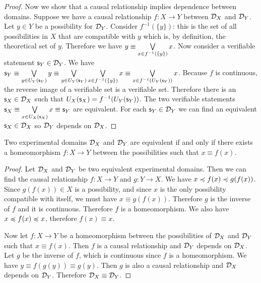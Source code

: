 \begin{mathSection}
\begin{proof}
		Now we show that a causal relationship implies dependence between domains. Suppose we have a causal relationship $f: X \to Y$ between $\mathcal{D}_X$ and $\mathcal{D}_Y$. Let $y \in Y$ be a possibility for $\mathcal{D}_Y$. Consider  $f^{-1}(\{y\})$: this is the set of all possibilities in $X$ that are compatible with $y$ which is, by definition, the theoretical set of $y$. Therefore we have $y \equiv \bigvee\limits_{x \in f^{-1}(\{y\})} x$. Now consider a verifiable statement $\mathsf{s}_Y \in \mathcal{D}_Y$. We have $\mathsf{s}_Y \equiv \bigvee\limits_{y \in U_Y(\mathsf{s}_Y)} y \equiv \bigvee\limits_{y \in U_Y(\mathsf{s}_Y)} \bigvee\limits_{x \in f^{-1}(\{y\})} x \equiv \bigvee\limits_{x \in f^{-1}(U_Y(\mathsf{s}_Y))} x$. Because $f$ is continuous, the reverse image of a verifiable set is a verifiable set. Therefore there is an $\mathsf{s}_X \in \mathcal{D}_X$ such that $U_X(\mathsf{s}_X) = f^{-1}(U_Y(\mathsf{s}_Y))$. The two verifiable statements $\mathsf{s}_X \equiv \bigvee\limits_{x \in U_X(\mathsf{s}_X)} x \equiv \mathsf{s}_Y$ are equivalent. For each $\mathsf{s}_Y \in \mathcal{D}_Y$ we can find an equivalent $\mathsf{s}_X \in \mathcal{D}_X$ so $\mathcal{D}_Y$ depends on $\mathcal{D}_X$.
	\end{proof}
	
	\begin{coro}
		Two experimental domains $\mathcal{D}_{X}$ and $\mathcal{D}_{Y}$ are equivalent if and only if there exists a homeomorphism $f : X \to Y$ between the possibilities such that $x \equiv f(x)$.
	\end{coro}
	\begin{proof}
		Let $\mathcal{D}_{X}$ and $\mathcal{D}_{Y}$ be two equivalent experimental domains. Then we can find the causal relationship $f : X \to Y$ and $g : Y \to X$. We have $x \preccurlyeq f(x) \preccurlyeq g(f(x))$. Since $g(f(x)) \in X$ is a possibility, and since $x$ is the only possibility compatible with itself, we must have $x \equiv g(f(x))$. Therefore $g$ is the inverse of $f$ and it is continuous. Therefore $f$ is a homeomorphism. We also have $x \preccurlyeq f(x) \preccurlyeq x$, therefore $f(x) \equiv x$.
		
		Now let $f : X \to Y$ be a homeomorphism between the possibilities of $\mathcal{D}_{X}$ and $\mathcal{D}_{Y}$ such that $x \equiv f(x)$. Then $f$ is a causal relationship and $\mathcal{D}_{Y}$ depends on $\mathcal{D}_{X}$. Let $g$ be the inverse of $f$, which is continuous since $f$ is a homeomorphism. We have $y \equiv f(g(y)) \equiv g(y)$. Then $g$ is also a causal relationship and $\mathcal{D}_{X}$ depends on $\mathcal{D}_{Y}$. Therefore $\mathcal{D}_{X} \equiv \mathcal{D}_{Y}$.
	\end{proof}
\end{mathSection}

